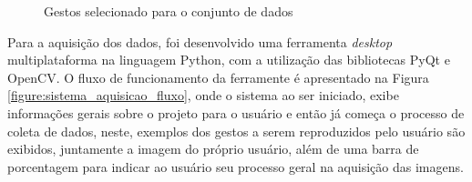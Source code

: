 \begin{figure}[H]
    \centering
    \caption{Gestos selecionado para o conjunto de dados}
    \qquad
    \qquad
    \qquad
    \label{figure:gestos_selecionados}%
\end{figure}

\par Para a aquisição dos dados, foi desenvolvido uma ferramenta \textit{desktop} multiplataforma na linguagem Python, com a utilização das bibliotecas PyQt e OpenCV. O fluxo de funcionamento da ferramente é apresentado na Figura \ref{figure:sistema_aquisicao_fluxo}, onde o sistema ao ser iniciado, exibe informações gerais sobre o projeto para o usuário e então já começa o processo de coleta de dados, neste, exemplos dos gestos a serem reproduzidos pelo usuário são exibidos, juntamente a imagem do próprio usuário, além de uma barra de porcentagem para indicar ao usuário seu processo geral na aquisição das imagens.


